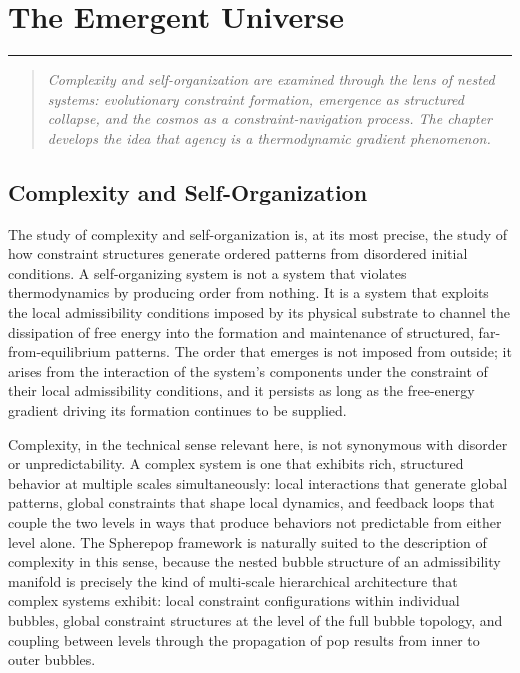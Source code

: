 \documentclass[12pt,openany]{book}
\theoremstyle{plain}
\theoremstyle{definition}
\theoremstyle{remark}
\newcommand{\chapterrule}{%
  \vspace{4pt}%
  {\color{SpherepopBlue}\rule{\textwidth}{0.8pt}}%
  \vspace{10pt}%
}
\newenvironment{chapterprecis}{%
  \begin{quote}\small\itshape}{%
  \end{quote}\medskip}
\begin{document}
\chapter{The Emergent Universe}
\chapterrule

\begin{chapterprecis}
Complexity and self-organization are examined through the lens of
nested systems: evolutionary constraint formation, emergence as
structured collapse, and the cosmos as a constraint-navigation
process. The chapter develops the idea that agency is a
thermodynamic gradient phenomenon.
\end{chapterprecis}

\section{Complexity and Self-Organization}

The study of complexity and self-organization is, at its most precise, the study of how constraint structures generate ordered patterns from disordered initial conditions. A self-organizing system is not a system that violates thermodynamics by producing order from nothing. It is a system that exploits the local admissibility conditions imposed by its physical substrate to channel the dissipation of free energy into the formation and maintenance of structured, far-from-equilibrium patterns. The order that emerges is not imposed from outside; it arises from the interaction of the system's components under the constraint of their local admissibility conditions, and it persists as long as the free-energy gradient driving its formation continues to be supplied.

Complexity, in the technical sense relevant here, is not synonymous with disorder or unpredictability. A complex system is one that exhibits rich, structured behavior at multiple scales simultaneously: local interactions that generate global patterns, global constraints that shape local dynamics, and feedback loops that couple the two levels in ways that produce behaviors not predictable from either level alone. The Spherepop framework is naturally suited to the description of complexity in this sense, because the nested bubble structure of an admissibility manifold is precisely the kind of multi-scale hierarchical architecture that complex systems exhibit: local constraint configurations within individual bubbles, global constraint structures at the level of the full bubble topology, and coupling between levels through the propagation of pop results from inner to outer bubbles.
\end{document}
